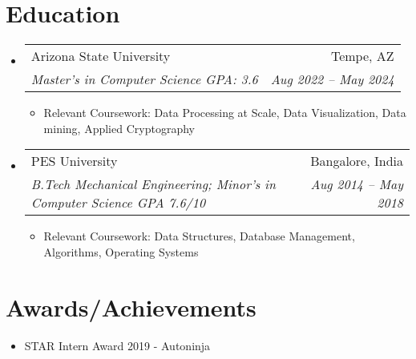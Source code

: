 \documentclass[letterpaper,11pt]{article}
\makeatletter
\newcommand{\resumeItem}[1]{
  \item\small{
    {#1 \vspace{-2pt}}
  }
}
\newcommand{\resumeSubheading}[4]{
  \vspace{-1pt}\item
    \begin{tabular*}{0.97\textwidth}[t]{l@{\extracolsep{\fill}}r}
      {#1} & #2 \\
      \textit{\small#3} & \textit{\small #4} \\
    \end{tabular*}\vspace{-6pt}
}
\newcommand{\resumeSubHeadingListStart}{\begin{itemize}[leftmargin=0.15in, label={}]}
\newcommand{\resumeSubHeadingListEnd}{\end{itemize}}
\newcommand{\resumeItemListStart}{\begin{itemize}}
\newcommand{\resumeItemListEnd}{\end{itemize}\vspace{-5pt}}
\makeatother
\begin{document}
\section{Education}
  \resumeSubHeadingListStart
    \resumeSubheading
      {Arizona State University}{Tempe, AZ}
      {Master's in Computer Science GPA: 3.6}{Aug 2022 -- May 2024}
    \resumeItemListStart
      \resumeItem{Relevant Coursework: Data Processing at Scale, Data Visualization, Data mining, Applied Cryptography }
    \resumeItemListEnd
    \resumeSubheading
      {PES University}{Bangalore, India}
      {B.Tech Mechanical Engineering; Minor's in Computer Science GPA 7.6/10}{Aug 2014 -- May 2018}
      \resumeItemListStart
        \resumeItem{Relevant Coursework: Data Structures, Database Management, Algorithms, Operating Systems}
    \resumeItemListEnd
  \resumeSubHeadingListEnd


%

 \section{Awards/Achievements}
 \resumeItemListStart
 \resumeItem{STAR Intern Award 2019 - Autoninja}
 \resumeItemListEnd


\end{document}
